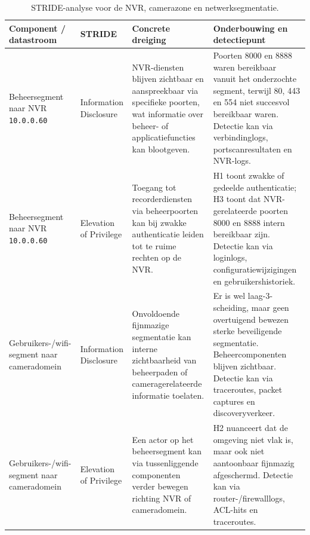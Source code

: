\begin{table}[H]
    \centering
    \scriptsize
    \caption[STRIDE-analyse voor NVR en segmentatie]{STRIDE-analyse voor de NVR, camerazone en netwerksegmentatie.}
    \label{tab:app-stride-nvr-segmentatie}
    \begin{tabularx}{\textwidth}{p{}p{}X X}
        \hline
        \textbf{Component / datastroom} & \textbf{STRIDE} & \textbf{Concrete dreiging} & \textbf{Onderbouwing en detectiepunt} \\
        \hline
        Beheersegment naar NVR \texttt{10.0.0.60} &
        Information Disclosure &
        NVR-diensten blijven zichtbaar en aanspreekbaar via specifieke poorten, wat informatie over beheer- of applicatiefuncties kan blootgeven. &
        Poorten 8000 en 8888 waren bereikbaar vanuit het onderzochte segment, terwijl 80, 443 en 554 niet succesvol bereikbaar waren. Detectie kan via verbindinglogs, portscanresultaten en NVR-logs. \\
        \hline
        Beheersegment naar NVR \texttt{10.0.0.60} &
        Elevation of Privilege &
        Toegang tot recorderdiensten via beheerpoorten kan bij zwakke authenticatie leiden tot te ruime rechten op de NVR. &
        H1 toont zwakke of gedeelde authenticatie; H3 toont dat NVR-gerelateerde poorten 8000 en 8888 intern bereikbaar zijn. Detectie kan via loginlogs, configuratiewijzigingen en gebruikershistoriek. \\
        \hline
        Gebruikers-/wifi-segment naar cameradomein &
        Information Disclosure &
        Onvoldoende fijnmazige segmentatie kan interne zichtbaarheid van beheerpaden of cameragerelateerde informatie toelaten. &
        Er is wel laag-3-scheiding, maar geen overtuigend bewezen sterke beveiligende segmentatie. Beheercomponenten blijven zichtbaar. Detectie kan via traceroutes, packet captures en discoveryverkeer. \\
        \hline
        Gebruikers-/wifi-segment naar cameradomein &
        Elevation of Privilege &
        Een actor op het beheersegment kan via tussenliggende componenten verder bewegen richting NVR of cameradomein. &
        H2 nuanceert dat de omgeving niet vlak is, maar ook niet aantoonbaar fijnmazig afgeschermd. Detectie kan via router-/firewalllogs, ACL-hits en traceroutes. \\
        \hline
    \end{tabularx}
\end{table}

\subsection{}%
\label{app:stride-remote-logging}

